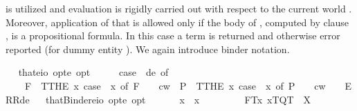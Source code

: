\begin{isabellebody}
\begin{isamarkuptext}
  is utilized and evaluation is rigidly carried out with respect to the current world .
  Moreover, application of that is allowed only if the body of \isa{{\isasymPhi}}, computed by clause 
  , is a propositional formula. In this case a term is returned and otherwise error 
  reported (for dummy entity ). We again introduce binder notation.%
\end{isamarkuptext}%
\isamarkuptrue%
\ \isamarkupfalse%
\ that{\isacharcolon}{\isacharcolon}{\isachardoublequoteopen}{\isacharparenleft}e{\isasymRightarrow}io\ opt{\isacharparenright}{\isasymRightarrow}e\ opt{\isachardoublequoteclose}\ {\isacharparenleft}{\isachardoublequoteopen}\isactrlbold {\isasymiota}{\isachardoublequoteclose}{\isacharparenright}\ \ \ {\isachardoublequoteopen}\isactrlbold {\isasymiota}{\isasymPhi}\ {\isasymequiv}\ case\ {\isacharparenleft}{\isasymPhi}\ de{\isacharparenright}\ of\isanewline
\ \ \ \ F{\isacharparenleft}{\isasymphi}{\isacharparenright}\ {\isasymRightarrow}\ T{\isacharparenleft}THE\ x{\isachardot}\ case\ {\isacharparenleft}{\isasymPhi}\ x{\isacharparenright}\ of\ F\ {\isasympsi}\ {\isasymRightarrow}\ {\isasympsi}\ cw{\isacharparenright}\ {\isacharbar}\ P{\isacharparenleft}{\isasymphi}{\isacharparenright}\ {\isasymRightarrow}\ T{\isacharparenleft}THE\ x{\isachardot}\ case\ {\isacharparenleft}{\isasymPhi}\ x{\isacharparenright}\ of\ P\ {\isasympsi}\ {\isasymRightarrow}\ {\isasympsi}\ cw{\isacharparenright}\ {\isacharbar}\ {\isacharunderscore}\ {\isasymRightarrow}\ ERR{\isacharparenleft}de{\isacharparenright}{\isachardoublequoteclose}\isanewline
\ \isamarkupfalse%
\ thatBinder{\isacharcolon}{\isacharcolon}{\isachardoublequoteopen}{\isacharparenleft}e{\isasymRightarrow}io\ opt{\isacharparenright}{\isasymRightarrow}e\ opt{\isachardoublequoteclose}\ {\isacharparenleft}\ {\isachardoublequoteopen}\isactrlbold {\isasymiota}{\isachardoublequoteclose}\ {\isacharbrackleft}{}{\isacharbrackright}\ {}{\isacharparenright}\ \ \ {\isachardoublequoteopen}\isactrlbold {\isasymiota}x{\isachardot}\ {\isasymphi}\ x\ {\isasymequiv}\ \isactrlbold {\isasymiota}\ {\isasymphi}{\isachardoublequoteclose}\isanewline
\isanewline
\ \isamarkupfalse%
\ \ \ {\isachardoublequoteopen}{\isasymlparr}\ F{}\isactrlsup T{\isacharcomma}{\isacharparenleft}\isactrlbold {\isasymiota}x{\isachardot}\ {\isasymlbrace}x\isactrlsup T{\isacharcomma}Q{}\isactrlsup T{\isasymrbrace}{\isacharparenright}{\isasymrparr}\ {\isacharequal}\ X{\isachardoublequoteclose}%

\end{isabellebody}
